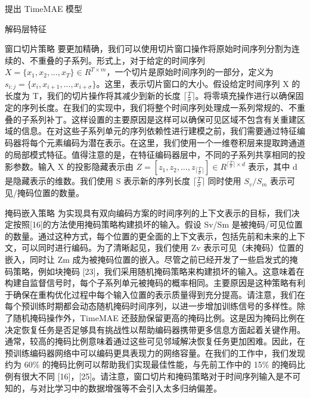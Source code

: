 \documentclass[a4paper,12pt]{article}
\begin{document}
\begin{section}{提出 TimeMAE 模型}
\begin{subsection}{解码层特征}
\begin{subsubsection}{窗口切片策略}
要更加精确，我们可以使用切片窗口操作将原始时间序列分割为连续的、不重叠的子系列。形式上，对于给定的时间序列 $X = \{x_1, x_2, ..., x_T \} \in R^{T \times m}$，一个切片是原始时间序列的一部分，定义为 $s_{i:j} = \{x_i, x_{i+1}, ..., x_{i+\sigma}\}$。这里，表示切片窗口的大小。假设给定时间序列 X 的长度为 T，我们的切片操作将其减少到新的长度 $\lceil \frac{T}{\sigma}\rceil$。将零填充操作进行以确保固定的序列长度。在我们的实现中，我们将整个时间序列处理成一系列常规的、不重叠的子系列补丁。这样设置的主要原因是这样可以确保可见区域不包含有关重建区域的信息。在对这些子系列单元的序列依赖性进行建模之前，我们需要通过特征编码器将每个元素编码为潜在表示。在这里，我们使用一个一维卷积层来提取跨通道的局部模式特征。值得注意的是，在特征编码器层中，不同的子系列共享相同的投影参数。输入 X 的投影隐藏表示由 $Z = [z_1, z_2, ..., z_{\lceil \frac{T}{\sigma}\rceil}] \in R^{\lceil \frac{T}{\sigma}\rceil \times d}$ 表示，其中 d 是隐藏表示的维数。我们使用 S 表示新的序列长度 $\lceil \frac{T}{\sigma}\rceil$ 同时使用 $S_v/S_m$ 表示可见/掩码位置的数量。
\end{subsubsection}
\begin{subsubsection}{掩码嵌入策略}
为实现具有双向编码方案的时间序列的上下文表示的目标，我们决定按照[16]的方法使用掩码策略构建损坏的输入。假设 Sv/Sm 是被掩码/可见位置的数量。通过这种方式，每个位置的更全面的上下文表示，包括先前和未来的上下文，可以同时进行编码。为了清晰起见，我们使用 Zv 表示可见（未掩码）位置的嵌入，同时让 Zm 成为被掩码位置的嵌入。尽管之前已经开发了一些启发式的掩码策略，例如块掩码 [23]，我们采用随机掩码策略来构建损坏的输入。这意味着在构建自监督信号时，每个子系列单元被掩码的概率相同。主要原因是这种策略有利于确保在重构优化过程中每个输入位置的表示质量得到充分提高。请注意，我们在每个预训练时期都会动态随机掩码时间序列，以进一步增加训练信号的多样性。除了随机掩码操作外，TimeMAE 还鼓励保留更高的掩码比例。这是因为掩码比例在决定恢复任务是否足够具有挑战性以帮助编码器携带更多信息方面起着关键作用。通常，较高的掩码比例意味着通过这些可见邻域解决恢复任务更加困难。因此，在预训练编码器网络中可以编码更具表现力的网络容量。在我们的工作中，我们发现约为 60\% 的掩码比例可以帮助我们实现最佳性能，与先前工作中的 15\% 的掩码比例有很大不同 [16]，[25]。请注意，窗口切片和掩码策略对于时间序列输入是不可知的，与对比学习中的数据增强等不会引入太多归纳偏差。
\end{subsubsection}
\end{subsection}


\end{section}
\end{document}
